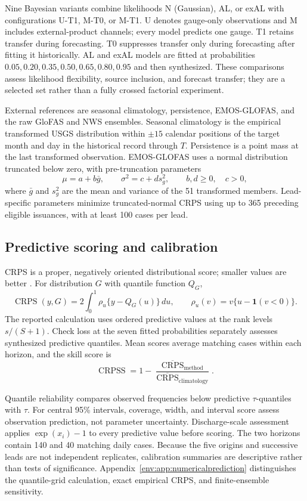 Nine Bayesian variants combine likelihoods N (Gaussian), AL, or exAL with
configurations U-T1, M-T0, or M-T1. U denotes gauge-only observations and M
includes external-product channels; every model predicts one gauge. T1
retains transfer during forecasting. T0 suppresses transfer only during
forecasting after fitting it historically. AL and exAL models are fitted at
probabilities $0.05,0.20,0.35,0.50,0.65,0.80,0.95$ and then synthesized.
These comparisons assess likelihood flexibility, source inclusion, and
forecast transfer; they are a selected set rather than a fully crossed
factorial experiment.

External references are seasonal climatology, persistence, EMOS-GLOFAS, and
the raw GloFAS and NWS ensembles. Seasonal climatology is the empirical
transformed USGS distribution within $\pm15$ calendar positions of the target
month and day in the historical record through $T$. Persistence is a point
mass at the last transformed observation. EMOS-GLOFAS uses a normal
distribution truncated below zero, with pre-truncation parameters
\[
\mu=a+b\bar g,\qquad \sigma^2=c+d s_g^2,
\qquad b,d\ge0,\quad c>0,
\]
where $\bar g$ and $s_g^2$ are the mean and variance of the 51 transformed
members. Lead-specific parameters minimize truncated-normal CRPS using up to
365 preceding eligible issuances, with at least 100 cases per lead.

\subsection{Predictive scoring and calibration}
\label{env:subsec:modelselection}

CRPS is a proper, negatively oriented distributional score; smaller values
are better \citep{env-gneiting2007strictly}. For distribution $G$ with
quantile function $Q_G$,
\[
\operatorname{CRPS}(y,G)=2\int_0^1\rho_u\{y-Q_G(u)\}\,du,
\qquad \rho_u(v)=v\{u-\mathbf1(v<0)\}.
\]
The reported calculation uses ordered predictive values at the rank levels
$s/(S+1)$. Check loss at the seven fitted probabilities separately assesses
synthesized predictive quantiles. Mean scores average matching cases within
each horizon, and the skill score is
\[
\operatorname{CRPSS}=1-
\frac{\overline{\operatorname{CRPS}}_{\mathrm{method}}}
{\overline{\operatorname{CRPS}}_{\mathrm{climatology}}}.
\]

Quantile reliability compares observed frequencies below predictive
$\tau$-quantiles with $\tau$. For central 95\% intervals, coverage, width,
and interval score assess observation prediction, not parameter uncertainty.
Discharge-scale assessment applies $\exp(x_i)-1$ to every predictive value
before scoring. The two horizons contain 140 and 40 matching daily cases.
Because the five origins and successive leads are not independent
replicates, calibration summaries are descriptive rather than tests of
significance. Appendix~\ref{env:app:numericalprediction} distinguishes the
quantile-grid calculation, exact empirical CRPS, and finite-ensemble
sensitivity.

